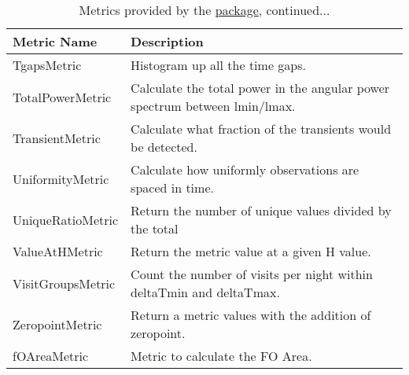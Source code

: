 \begin{table}[!ht]
\scriptsize
\setcounter{table}{0}
\makeatletter
\renewcommand{\thetable}{A.\arabic{table}}
\caption{Metrics provided by the
\href{https://github.com/lsst/sims_maf/tree/master/python/lsst/sims/maf}{\MAF package}, continued...}
\medskip
\begin{tabular}{ll}
\hline
                   Metric Name &                                                                       Description \\
\hline\hline
 TgapsMetric &  Histogram up all the time gaps. \\
 TotalPowerMetric &  Calculate the total power in the angular power spectrum between lmin/lmax. \\
 TransientMetric &  Calculate what fraction of the transients would be detected. \\
 UniformityMetric &  Calculate how uniformly observations are spaced in time. \\
 UniqueRatioMetric &  Return the number of unique values divided by the total \\
 ValueAtHMetric &  Return the metric value at a given H value. \\
 VisitGroupsMetric &  Count the number of visits per night within deltaTmin and deltaTmax. \\
 ZeropointMetric &  Return a metric values with the addition of zeropoint. \\
 fOAreaMetric &  Metric to calculate the FO Area. \\
\hline
\end{tabular}
\end{table}
